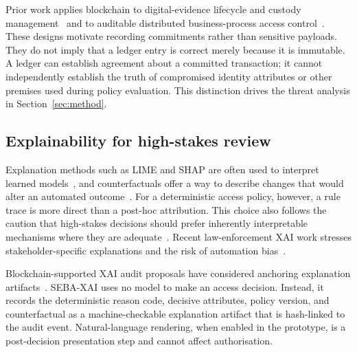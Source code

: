 Prior work applies blockchain to digital-evidence lifecycle and custody
management~\cite{jeong_fabric_evidence_2020,kim_two_level_2021,li_lechain_2021}
and to auditable distributed business-process access
control~\cite{akhtar_auditable_access_2020}. These designs motivate recording
commitments rather than sensitive payloads. They do not imply that a ledger
entry is correct merely because it is immutable. A ledger can establish
agreement about a committed transaction; it cannot independently establish the
truth of compromised identity attributes or other premises used during policy
evaluation. This distinction drives the threat analysis in
Section~\ref{sec:method}.

\subsection{Explainability for high-stakes review}

Explanation methods such as LIME and SHAP are often used to interpret learned
models~\cite{ribeiro_lime_2016,lundberg_shap_2017}, and counterfactuals offer a
way to describe changes that would alter an automated
outcome~\cite{wachter_counterfactual_2018}. For a deterministic access policy,
however, a rule trace is more direct than a post-hoc attribution. This choice
also follows the caution that high-stakes decisions should prefer inherently
interpretable mechanisms where they are adequate~\cite{rudin_2019}. Recent
law-enforcement XAI work stresses stakeholder-specific explanations and the
risk of automation bias~\cite{zocholl_xai_law_enforcement_2025}.

Blockchain-supported XAI audit proposals have considered anchoring explanation
artifacts~\cite{nassar_blockchain_xai_2020,malhotra_xai_audit_2021}. SEBA-XAI
uses no model to make an access decision. Instead, it records the deterministic
reason code, decisive attributes, policy version, and counterfactual as a
machine-checkable explanation artifact that is hash-linked to the audit event.
Natural-language rendering, when enabled in the prototype, is a post-decision
presentation step and cannot affect authorisation.

